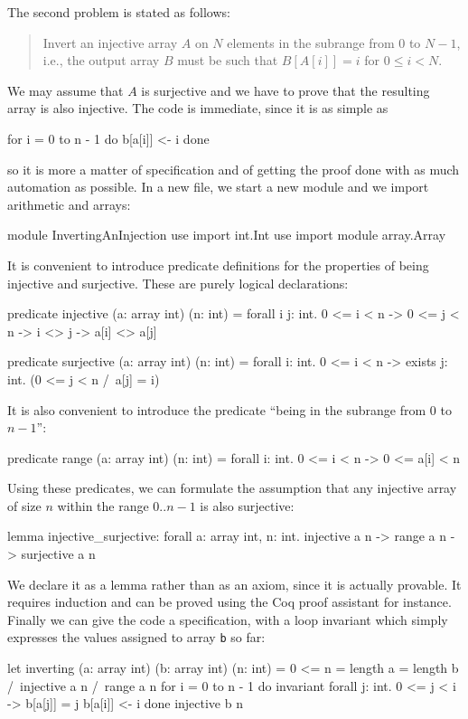 The second problem is stated as follows:
\begin{quote}
  Invert an injective array $A$ on $N$ elements in the
  subrange from $0$ to $N - 1$, i.e., the output array $B$ must be
  such that $B[A[i]] = i$ for $0 \le i < N$.
\end{quote}
We may assume that $A$ is surjective and we have to prove
that the resulting array is also injective.
The code is immediate, since it is as simple as
\begin{whycode}
    for i = 0 to n - 1 do b[a[i]] <- i done
\end{whycode}
so it is more a matter of specification and of getting the proof done
with as much automation as possible. In a new file, we start a new
module and we import arithmetic and arrays:
\begin{whycode}
module InvertingAnInjection
  use import int.Int
  use import module array.Array
\end{whycode}
It is convenient to introduce predicate definitions for the properties
of being injective and surjective. These are purely logical
declarations:
\begin{whycode}
  predicate injective (a: array int) (n: int) =
    forall i j: int. 0 <= i < n -> 0 <= j < n -> i <> j -> a[i] <> a[j]

  predicate surjective (a: array int) (n: int) =
    forall i: int. 0 <= i < n -> exists j: int. (0 <= j < n /\ a[j] = i)
\end{whycode}
It is also convenient to introduce the predicate ``being in the
subrange from 0 to $n-1$'':
\begin{whycode}
  predicate range (a: array int) (n: int) =
    forall i: int. 0 <= i < n -> 0 <= a[i] < n
\end{whycode}
Using these predicates, we can formulate the assumption that any
injective array of size $n$ within the range $0..n-1$ is also surjective:
\begin{whycode}
  lemma injective_surjective:
    forall a: array int, n: int.
    injective a n -> range a n -> surjective a n
\end{whycode}
We declare it as a lemma rather than as an axiom, since it is actually
provable. It requires induction and can be proved using the Coq proof
assistant for instance.
Finally we can give the code a specification, with a loop invariant
which simply expresses the values assigned to array \texttt{b} so far:
\begin{whycode}
  let inverting (a: array int) (b: array int) (n: int) =
    { 0 <= n = length a = length b /\ injective a n /\ range a n }
    for i = 0 to n - 1 do
      invariant { forall j: int. 0 <= j < i -> b[a[j]] = j }
      b[a[i]] <- i
    done
    { injective b n }
\end{whycode}

